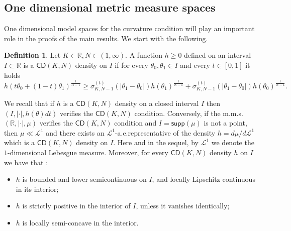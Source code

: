 \documentclass[12pt]{article}
\newcommand{\R}{\mathbb{R}}
\theoremstyle{plain}
\theoremstyle{definition}
\newtheorem{definition}[lemma]{Definition}
\begin{document}
\subsection{One dimensional metric measure spaces}
One dimensional model spaces for the curvature condition will play an important role in the proofs of the main results. We start with the following.
\begin{definition}
Let $K\in \mathbb{R}, N\in (1,\infty)$. A function $h\ge 0$ defined on an interval $I\subset \R$ is a $\mathsf{CD}(K,N)$ density on $I$ if for every $\theta_0,\theta_1\in I$ and every $t\in [0,1]$ it holds
\begin{equation}\label{eq:defhCD}
 h(t\theta_0+(1-t)\theta_1)^{\frac{1}{N-1}}\ge \sigma_{K,N-1}^{(t)}(|\theta_1-\theta_0|)h(\theta_1)^{\frac{1}{N-1}}+\sigma_{K,N-1}^{(t)}(|\theta_1-\theta_0|)h(\theta_0)^{\frac{1}{N-1}}.
\end{equation}
\end{definition}

We recall that if $h$ is a $\mathsf{CD}(K,N)$ density on a closed interval $I$ then $(I, |\cdot|, h(\theta)dt)$ verifies the $\mathsf{CD}(K,N)$ condition. Conversely, if the m.m.s. $(\mathbb{R}, |\cdot| , \mu)$ verifies the $\mathsf{CD}(K,N)$ condition and $I = \mathsf{supp}(\mu)$ is not a point, then $\mu\ll\mathcal{L}^1$ and there exists an $\mathcal{L}^1$-a.e.\;representative  of the density $h=d\mu/d\mathcal{L}^1$ which is a $\mathsf{CD}(K,N)$ density on $I$. Here and in the sequel, by $\mathcal{L}^1$ we denote the $1$-dimensional Lebesgue measure. Moreover, for every $\mathsf{CD}(K,N)$ density $h$ on $I$ we have that \cite{CaMi}:
\begin{itemize}
    \item $h$ is bounded and lower semicontinuous on $I$, and locally Lipschitz continuous in its interior;
    \item $h$ is strictly positive in the interior of $I$, unless it vanishes identically;
    \item $h$ is locally semi-concave in the interior. 
\end{itemize}
\end{document}
